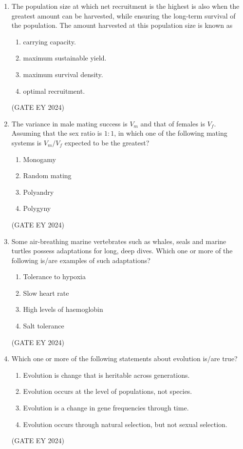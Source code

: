 \documentclass[journal]{IEEEtran}
\begin{document}
\begin{enumerate}
\item The population size at which net recruitment is the highest is also when the greatest amount can be harvested, while ensuring the long-term survival of the population. The amount harvested at this population size is known as
    \begin{multicols}{2}
    \begin{enumerate}
        \item carrying capacity.
        \item maximum sustainable yield.
        \item maximum survival density.
        \item optimal recruitment.
    \end{enumerate}
    \end{multicols}
\hfill{(GATE EY 2024)}

\item The variance in male mating success is $V_m$ and that of females is $V_f$. Assuming that the sex ratio is $1:1$, in which one of the following mating systems is $V_m/V_f$ expected to be the greatest?
    \begin{multicols}{2}
    \begin{enumerate}
        \item Monogamy
        \item Random mating
        \item Polyandry
        \item Polygyny
    \end{enumerate}
    \end{multicols}
\hfill{(GATE EY 2024)}

\item Some air-breathing marine vertebrates such as whales, seals and marine turtles possess adaptations for long, deep dives. Which one or more of the following is/are examples of such adaptations?
    \begin{multicols}{2}
    \begin{enumerate}
        \item Tolerance to hypoxia
        \item Slow heart rate
        \item High levels of haemoglobin
        \item Salt tolerance
    \end{enumerate}
    \end{multicols}
\hfill{(GATE EY 2024)}

\item Which one or more of the following statements about evolution is/are true?
    \begin{enumerate}
        \item Evolution is change that is heritable across generations.
        \item Evolution occurs at the level of populations, not species.
        \item Evolution is a change in gene frequencies through time.
        \item Evolution occurs through natural selection, but not sexual selection.
    \end{enumerate}
\hfill{(GATE EY 2024)}


\end{enumerate}
\end{document}
